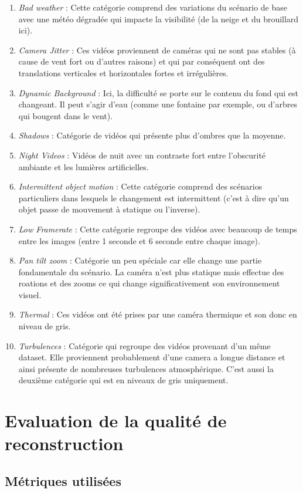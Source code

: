 \begin{enumerate}
		\item \textit{Bad weather} : Cette catégorie comprend des variations du scénario de base avec une météo dégradée qui impacte la visibilité (de la neige et du brouillard ici).
		\item \textit{Camera Jitter} : Ces vidéos proviennent de caméras qui ne sont pas stables (à cause de vent fort ou d'autres raisons) et qui par conséquent ont des translations verticales et horizontales fortes et irrégulières. 
		\item \textit{Dynamic Background} : Ici, la difficulté se porte sur le contenu du fond qui est changeant. Il peut s'agir d'eau (comme une fontaine par exemple, ou d'arbres qui bougent dans le vent).
		\item \textit{Shadows} : Catégorie de vidéos qui présente plus d'ombres que la moyenne.
		\item \textit{Night Videos} : Vidéos de nuit avec un contraste fort entre l'obscurité ambiante et les lumières artificielles.
		\item \textit{Intermittent object motion} : Cette catégorie comprend des scénarios particuliers dans lesquels le changement est intermittent (c'est à dire qu'un objet passe de mouvement à statique ou l'inverse).
		\item \textit{Low Framerate} : Cette catégorie regroupe des vidéos avec beaucoup de temps entre les images (entre 1 seconde et 6 seconde entre chaque image).
		\item \textit{Pan tilt zoom} : Catégorie un peu spéciale car elle change une partie fondamentale du scénario. La caméra n'est plus statique mais effectue des roations et des zooms ce qui change significativement son environnement visuel. 
		\item \textit{Thermal} : Ces vidéos ont été prises par une caméra thermique et son donc en niveau de gris.
		\item \textit{Turbulences} : Catégorie qui regroupe des vidéos provenant d'un même dataset. Elle proviennent probablement d'une camera a longue distance et ainsi présente de nombreuses turbulences atmosphérique. C'est aussi la deuxième catégorie qui est en niveaux de gris uniquement.
	\end{enumerate}

	\section{Evaluation de la qualité de reconstruction}
	\subsection{Métriques utilisées}
